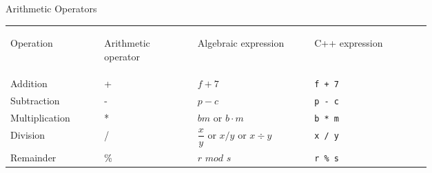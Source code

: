 \documentclass[11pt]{beamer}
\begin{document}
\begin{frame}{\small Arithmetic Operators}
	\centering\tiny\renewcommand{\arraystretch}{2.5}
	\begin{tabular}{p{0.15\linewidth} p{0.16\linewidth} p{0.2\linewidth} p{0.2\linewidth}}
		
		\rowcolor{cyan}\color{white} 
		\begin{flushleft}
			Operation 
		\end{flushleft}
		& \color{white} 
		\begin{flushleft}
			Arithmetic operator
		\end{flushleft} 
		& \color{white} 
		\begin{flushleft}
			Algebraic expression
		\end{flushleft} 
		& \color{white} 
		\begin{flushleft}
			C++ expression 
		\end{flushleft}
		\\
		
		\rowcolor{lightcyan} Addition & + & $f + 7$ & \texttt{f + 7} \\
		
		\rowcolor{lightcyan} Subtraction & - & $p - c$ & \texttt{p - c} \\
		
		\rowcolor{lightcyan} Multiplication & * & $bm$ or $b \cdot m$ & \texttt{b * m} \\
		
		\rowcolor{lightcyan} Division & / & $\dfrac{x}{y}$ or $x/y$ or $x\div y$ & \texttt{x / y} \\
		
		\rowcolor{lightcyan} Remainder & \% & $r$ $mod$ $s$ & \texttt{r \% s} 
	\end{tabular}
\end{frame}
\end{document}
